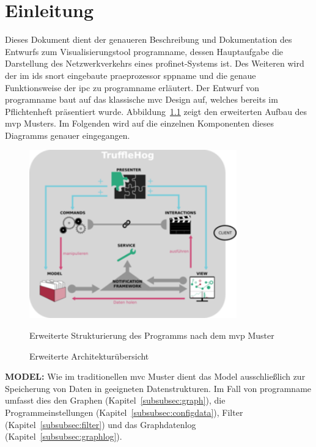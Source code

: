\chapter{Einleitung}
Dieses Dokument dient der genaueren Beschreibung und Dokumentation des Entwurfs zum Visualisierungstool \gls{programname}, dessen Hauptaufgabe die Darstellung des Netzwerkverkehrs eines \gls{profinet}-Systems ist. Des Weiteren wird der im \gls{ids} \gls{snort} eingebaute \gls{praeprozessor} \gls{sppname} und die genaue Funktionsweise der \gls{ipc} zu \gls{programname} erläutert.\newline
 \newline
Der Entwurf von \gls{programname} baut auf das klassische \gls{mvc} Design auf, welches bereits im Pflichtenheft präsentiert wurde. Abbildung~\ref{fig:arch_diagram} zeigt den erweiterten Aufbau des \gls{mvp} Musters. Im Folgenden wird auf die einzelnen Komponenten dieses Diagramms genauer eingegangen.\newline
\begin{figure}[H]
  \centering
  \includegraphics[width=0.8\textwidth]{../diagramimages/arch_diagram_mvp_test.png}
  \caption[Erweiterte Architekturübersicht]{Erweiterte Architekturübersicht}
  \medskip
  Erweiterte Strukturierung des Programms nach dem \gls{mvp} Muster
  \label{fig:arch_diagram}
\end{figure}\newpage
\textbf{MODEL:}\newline
Wie im traditionellen \gls{mvc} Muster dient das Model ausschließlich zur Speicherung von Daten in geeigneten Datenstrukturen. Im Fall von \gls{programname} umfasst dies den Graphen (Kapitel~\ref{subsubsec:graph}), die Programmeinstellungen (Kapitel~\ref{subsubsec:configdata}), Filter (Kapitel~\ref{subsubsec:filter}) und das Graphdatenlog (Kapitel~\ref{subsubsec:graphlog}).\newline
